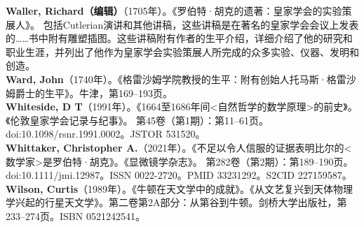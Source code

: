 \textbf{Waller, Richard（编辑）}（1705年）。《罗伯特·胡克的遗著：皇家学会的实验策展人》。 包括Cutlerian演讲和其他讲稿，这些讲稿是在著名的皇家学会会议上发表的……书中附有雕塑插图。这些讲稿附有作者的生平介绍，详细介绍了他的研究和职业生涯，并列出了他作为皇家学会实验策展人所完成的众多实验、仪器、发明和创造。\\
\textbf{Ward, John}（1740年）。《格雷沙姆学院教授的生平：附有创始人托马斯·格雷沙姆爵士的生平》。牛津，第169–193页。\\
\textbf{Whiteside, D T}（1991年）。《1664至1686年间<自然哲学的数学原理>的前史》。《伦敦皇家学会记录与纪事》。 第45卷（第1期）：第11–61页。doi:10.1098/rsnr.1991.0002。JSTOR 531520。\\
\textbf{Whittaker, Christopher A.}（2021年）。《不足以令人信服的证据表明比尔的<数学家>是罗伯特·胡克》。《显微镜学杂志》。 第282卷（第2期）：第189–190页。doi:10.1111/jmi.12987。ISSN 0022-2720。PMID 33231292。S2CID 227159587。\\
\textbf{Wilson, Curtis}（1989年）。《牛顿在天文学中的成就》。《从文艺复兴到天体物理学兴起的行星天文学》。第二卷第2A部分：从第谷到牛顿。剑桥大学出版社，第233–274页。ISBN 0521242541。